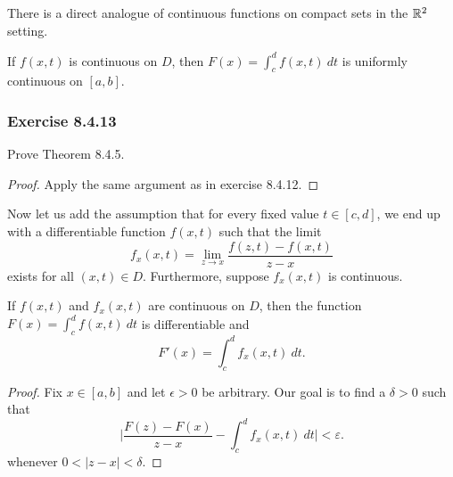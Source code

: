 There is a direct analogue of continuous functions on compact sets in the \( \mathbb{R}^{2} \) setting.

\begin{theorem}{}{}
    If \( f(x,t)  \) is continuous on \( D  \), then \( F(x) = \int_{ c }^{ d } f(x,t) \ dt \) is uniformly continuous on \( [a,b]  \).
\end{theorem}

\subsubsection{Exercise 8.4.13} Prove Theorem 8.4.5. 

\begin{proof}
Apply the same argument as in exercise 8.4.12.
\end{proof}

Now let us add the assumption that for every fixed value \( t \in [c,d] \), we end up with a differentiable function \( f(x,t) \) such that the limit
\[  f_{x}(x,t) = \lim_{ z \to x }  \frac{ f(z,t) - f(x,t)  }{  z -x  }  \] 
exists for all \( (x,t) \in D  \). Furthermore, suppose \( f_{x}(x,t)  \) is continuous.

\begin{theorem}{}{}
    If \( f(x,t)  \) and \( f_{x}(x,t)  \) are continuous on \( D  \), then the function \( F(x) = \int_{ c }^{ d }  f(x,t) \ dt    \) is differentiable and 
    \[  F'(x) = \int_{ c }^{ d } f_{x}(x,t) \ dt. \]
\end{theorem}

\begin{proof}
    Fix \( x \in [a,b]  \) and let \( \epsilon > 0  \) be arbitrary. Our goal is to find a \( \delta > 0  \) such that 
    \[  \Big| \frac{ F(z) - F(x)  }{ z -x  }  - \int_{ c }^{ d }  f_{x}(x,t) \ dt \Big| < \varepsilon. \tag{5} \]
    whenever \( 0 < | z  -x  | < \delta  \).
\end{proof}

